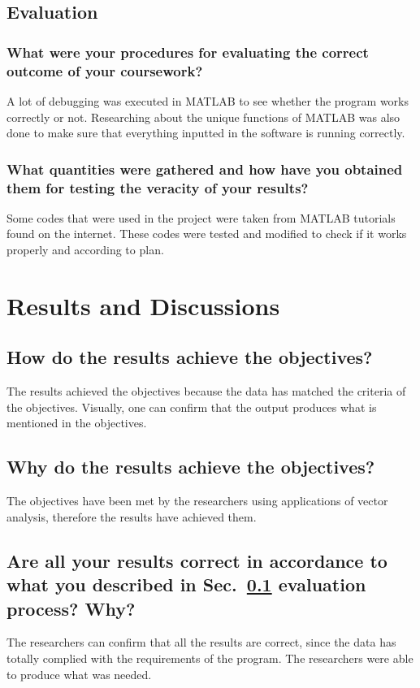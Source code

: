 \subsection{Evaluation}
\label{sec:eval}

\subsubsection{What were your procedures for evaluating the correct outcome of your coursework?}
A lot of debugging was executed in MATLAB to see whether the program works correctly or not. Researching about the unique functions of MATLAB was also done to make sure that everything inputted in the software is running correctly.
	
\subsubsection{What quantities were gathered and how have you obtained them for testing the veracity of your results?}

Some codes that were used in the project were taken from MATLAB tutorials found on the internet. These codes were tested and modified to check if it works properly and according to plan.


\section{Results and Discussions}

\subsection{How do the results achieve the objectives?}
The results achieved the objectives because the data has matched the criteria of the objectives. Visually, one can confirm that the output produces what is mentioned in the objectives.
\subsection{Why do the results achieve the objectives?}
The objectives have been met by the researchers using applications of vector analysis, therefore the results have achieved them.
	
\subsection{Are all your results correct  in accordance to what you described in Sec.~\ref{sec:eval} evaluation process? Why?} 
The researchers can confirm that all the results are correct, since the data has totally complied with the requirements of the program. The researchers were able to produce what was needed.
